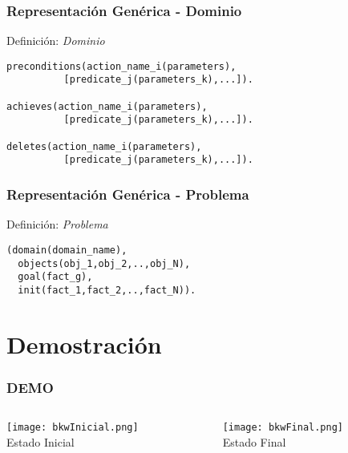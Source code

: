 \documentclass[bigger]{beamer}
\begin{document}
\begin{frame}[fragile]
\frametitle{Representación Genérica - Dominio}
\label{sec-3.8}
\begin{block}{Definición: \emph{Dominio}}
\label{sec-3.8.1}

 \begin{verbatim}
preconditions(action_name_i(parameters), 
          [predicate_j(parameters_k),...]).
   
achieves(action_name_i(parameters),
          [predicate_j(parameters_k),...]).

deletes(action_name_i(parameters),
          [predicate_j(parameters_k),...]).
 \end{verbatim}
\end{block}
\end{frame}
\begin{frame}[fragile]
\frametitle{Representación Genérica - Problema}
\label{sec-3.9}
\begin{block}{Definición: \emph{Problema}}
\label{sec-3.9.1}

 \begin{verbatim}
(domain(domain_name),
  objects(obj_1,obj_2,..,obj_N),
  goal(fact_g),
  init(fact_1,fact_2,..,fact_N)).
 \end{verbatim}
\end{block}
\end{frame}
\section{Demostración}
\label{sec-4}
\begin{frame}
\frametitle{DEMO}
\label{sec-4.1}
\begin{columns}
\begin{column}{0.4\textwidth}
\label{sec-4.1.1}

    \begin{center}\texttt{[image: bkwInicial.png]}\\\caption{Estado Inicial}\end{center}
    
\end{column}
\begin{column}{0.4\textwidth}
\label{sec-4.1.2}

    \begin{center}\texttt{[image: bkwFinal.png]}\\\caption{Estado Final}\end{center}
\end{column}
\end{columns}
\end{frame}
\end{document}

